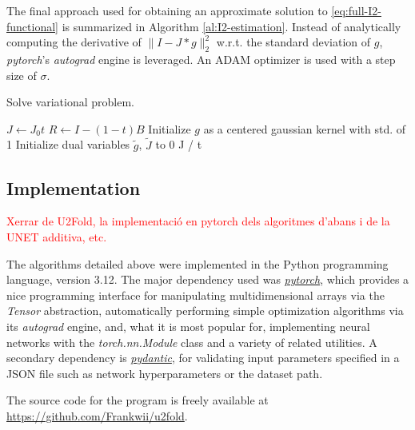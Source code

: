 \documentclass[twocolumn,twoside,a4paper,10pt]{IEEEtran}
\newcommand{\Frank}[1]{\textcolor{red}{#1}}
\begin{document}
The final approach used for obtaining an approximate solution to \cref{eq:full-I2-functional} is summarized in Algorithm \ref{al:I2-estimation}. Instead of analytically computing the derivative of \(\|I-J\ast g\|_2^2\) w.r.t. the standard deviation of \(g\), \textit{pytorch}'s \textit{autograd} engine is leveraged. An ADAM optimizer is used with a step size of \(\sigma\).

\begin{algorithm}\caption{Solve variational problem.}
\label{al:I2-estimation}
\(J\gets J_0t\)\;
\(R\gets I - (1-t)B\)\;
Initialize \(g\) as a centered gaussian kernel with std. of 1\;
Initialize dual variables \(\tilde{g}\), \(\tilde{J}\) to 0\;
\Return J / t
\end{algorithm}

\subsection{Implementation}
\Frank{Xerrar de U2Fold, la implementació en pytorch dels algoritmes d'abans i de la UNET additiva, etc.}

The algorithms detailed above were implemented in the Python programming
language, version 3.12. The major dependency used was \href{https://pytorch.org/}{\textit{pytorch}}, which
provides a nice programming interface for manipulating multidimensional arrays 
via the \textit{Tensor} abstraction, automatically performing simple
optimization algorithms via its \textit{autograd} engine, and, what it is most
popular for, implementing neural networks with the \textit{torch.nn.Module}
class and a variety of related utilities. A secondary dependency is
\href{https://pydantic.com.cn/en/}{\textit{pydantic}}, for validating input parameters specified in a JSON file
such as network hyperparameters or the dataset path.

The source code for the program is freely available at \href{https://github.com/Frankwii/u2fold}{https://github.com/Frankwii/u2fold}.
\end{document}
